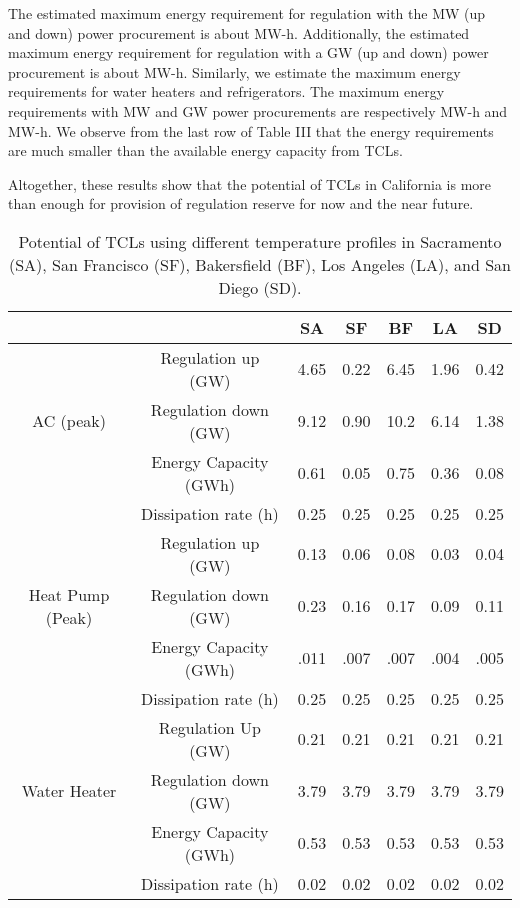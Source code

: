 \documentclass[onecolumn,journal]{IEEEtran}
\begin{document}
The estimated maximum energy requirement for regulation with the  MW (up and down) power procurement is about  MW-h. Additionally, the estimated maximum energy requirement for regulation with a  GW (up and down) power procurement is about  MW-h. Similarly, we estimate the maximum energy requirements for water heaters and refrigerators. The maximum energy requirements with  MW and  GW power procurements are respectively  MW-h and  MW-h. We observe from the last row of Table III that the energy requirements are much smaller than the available energy capacity from \acp{TCL}. 


Altogether, these results show that the potential of \acp{TCL} in California is more than enough for provision of regulation reserve for now and the near future. 

\begin{table}[tb]
\caption{Potential of \acp{TCL} using different temperature profiles in Sacramento (SA), San Francisco (SF), Bakersfield (BF), Los Angeles (LA), and San Diego (SD).}
\label{tab:potential}
\vspace{6 pt}
\centering
{\scriptsize
\begin{tabular}{c c|| c| c | c | c | c}
 & & SA & SF & BF & LA & SD \\
 \hline \hline
\multirow{3}{*}{AC (peak)} & Regulation up (GW) &  4.65 & 0.22 & 6.45 & 1.96 &0.42 \\
 & Regulation down (GW)  &  9.12 & 0.90 & 10.2& 6.14 & 1.38 \\
 & Energy Capacity (GWh)  &  0.61 & 0.05 & 0.75 & 0.36 & 0.08 \\
 & Dissipation rate (h) & 0.25 & 0.25 & 0.25 & 0.25 & 0.25 \\
\hline
\multirow{3}{*}{Heat Pump (Peak)} & Regulation up (GW)  &  0.13 & 0.06 & 0.08 & 0.03 & 0.04 \\
 & Regulation down (GW)  &  0.23 & 0.16 & 0.17 & 0.09 & 0.11 \\
 & Energy Capacity (GWh)  &  .011 & .007 & .007 & .004 & .005 \\
 & Dissipation rate (h) & 0.25 & 0.25 & 0.25 & 0.25 & 0.25 \\
\hline
\multirow{3}{*}{Water Heater} & Regulation Up (GW)  &  0.21 & 0.21 & 0.21 & 0.21 &0.21\\
 & Regulation down (GW) &  3.79 & 3.79 & 3.79 & 3.79 & 3.79 \\
 & Energy Capacity (GWh) &  0.53 & 0.53 & 0.53 & 0.53 &0.53 \\
  & Dissipation rate (h) & 0.02 & 0.02 & 0.02 & 0.02 & 0.02 \\

\end{tabular}}
\end{table}
\end{document}
